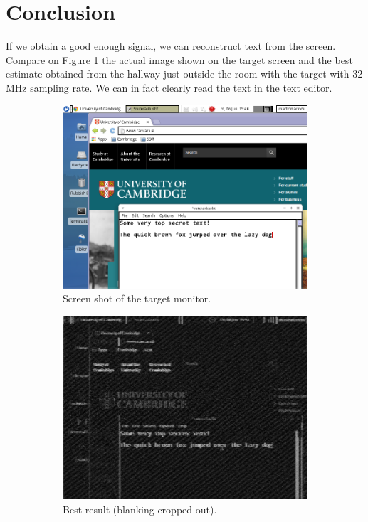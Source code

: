 \documentclass[a4paper,12pt,twoside,openright]{report}
\begin{document}
\section{Conclusion}

If we obtain a good enough signal, we can reconstruct text from the screen. Compare on Figure \ref{fig:demobest} the actual image shown on the target screen and the best estimate obtained from the hallway just outside the room with the target with $32$ MHz sampling rate. We can in fact clearly read the text in the text editor.

\begin{figure}[p!]
\centering
\begin{subfigure}[b]{0.9\textwidth}
  \includegraphics[width=\textwidth]{demo_actual}
  \caption{Screen shot of the target monitor.}
\end{subfigure}
\begin{subfigure}[b]{0.9\textwidth}
  \includegraphics[width=\textwidth]{demo_bestresult}
  \caption{Best result (blanking cropped out).}
\end{subfigure}
  \caption{}
  \label{fig:demobest}
\end{figure}
\end{document}
